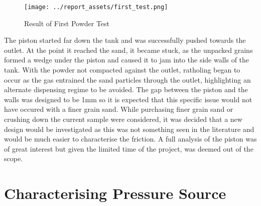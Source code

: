 \begin{figure}[htbp]
    \centering
    
    \begin{minipage}{0.6\textwidth}
        \centering
        \texttt{[image: ../report\_assets/first\_test.png]}
        \caption{Result of First Powder Test}\label{fig:first-test}
    \end{minipage}
    
\end{figure}
The piston started far down the tank and was successfully pushed towards the outlet. At the point it reached the sand, it became stuck, as the unpacked grains formed a wedge under the piston and caused it to jam into the side walls of the tank. With the powder not compacted against the outlet, ratholing began to occur as the gas entrained the sand particles through the outlet, highlighting an alternate dispensing regime to be avoided. The gap between the piston and the walls was designed to be 1mm so it is expected that this specific issue would not have occured with a finer grain sand. While purchasing finer grain sand or crushing down the current sample were considered, it was decided that a new design would be investigated as this was not something seen in the literature and would be much easier to characterise the friction. A full analysis of the piston was of great interest but given the limited time of the project, was deemed out of the scope. 

\section{Characterising Pressure Source}\label{sec:static_test}

